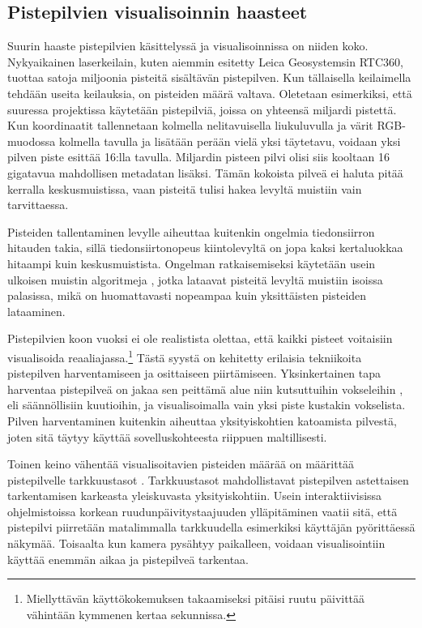 \subsection{Pistepilvien visualisoinnin haasteet}

Suurin haaste pistepilvien käsittelyssä ja visualisoinnissa on niiden koko. Nykyaikainen laserkeilain, kuten aiemmin esitetty Leica Geosystemsin RTC360, tuottaa satoja miljoonia pisteitä sisältävän pistepilven. Kun tällaisella keilaimella tehdään useita keilauksia, on pisteiden määrä valtava. Oletetaan esimerkiksi, että suuressa projektissa käytetään pistepilviä, joissa on yhteensä miljardi pistettä. Kun koordinaatit tallennetaan kolmella nelitavuisella liukuluvulla ja värit RGB-muodossa kolmella tavulla ja lisätään perään vielä yksi täytetavu, voidaan yksi pilven piste esittää 16:lla tavulla. Miljardin pisteen pilvi olisi siis kooltaan 16 gigatavua mahdollisen metadatan lisäksi. Tämän kokoista pilveä ei haluta pitää kerralla keskusmuistissa, vaan pisteitä tulisi hakea levyltä muistiin vain tarvittaessa. 

Pisteiden tallentaminen levylle aiheuttaa kuitenkin ongelmia tiedonsiirron hitauden takia, sillä tiedonsiirtonopeus kiintolevyltä on jopa kaksi kertaluokkaa hitaampi kuin keskusmuistista. Ongelman ratkaisemiseksi käytetään usein ulkoisen muistin algoritmeja , jotka lataavat pisteitä levyltä muistiin isoissa palasissa, mikä on huomattavasti nopeampaa kuin yksittäisten pisteiden lataaminen. \cite{scheiblauer} 

Pistepilvien koon vuoksi ei ole realistista olettaa, että kaikki pisteet voitaisiin visualisoida reaaliajassa.\footnote{Miellyttävän käyttökokemuksen takaamiseksi pitäisi ruutu päivittää vähintään kymmenen kertaa sekunnissa.} Tästä syystä on kehitetty erilaisia tekniikoita pistepilven harventamiseen ja osittaiseen piirtämiseen. Yksinkertainen tapa harventaa pistepilveä on jakaa sen peittämä alue niin kutsuttuihin vokseleihin , eli säännöllisiin kuutioihin, ja visualisoimalla vain yksi piste kustakin vokselista. Pilven harventaminen kuitenkin aiheuttaa yksityiskohtien katoamista pilvestä, joten sitä täytyy käyttää sovelluskohteesta riippuen maltillisesti. 

Toinen keino vähentää visualisoitavien pisteiden määrää on määrittää pistepilvelle tarkkuustasot . Tarkkuustasot mahdollistavat pistepilven astettaisen tarkentamisen karkeasta yleiskuvasta yksityiskohtiin. Usein interaktiivisissa ohjelmistoissa korkean ruudunpäivitystaajuuden ylläpitäminen vaatii sitä, että pistepilvi piirretään matalimmalla tarkkuudella esimerkiksi käyttäjän pyörittäessä näkymää. Toisaalta kun kamera pysähtyy paikalleen, voidaan visualisointiin käyttää enemmän aikaa ja pistepilveä tarkentaa.


